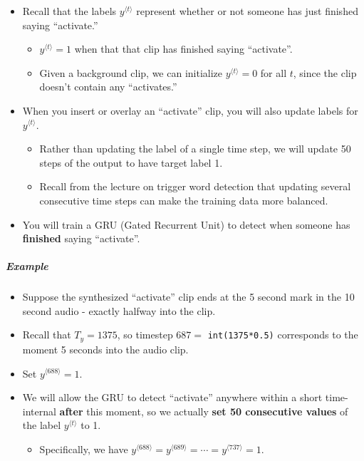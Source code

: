 \documentclass[11pt]{article}
\begin{document}
\begin{itemize}
\itemsep1pt\parskip0pt
\item
  Recall that the labels $y^{\langle t \rangle}$ represent whether or
  not someone has just finished saying ``activate.''

  \begin{itemize}
  \itemsep1pt\parskip0pt
  \item
    $y^{\langle t \rangle} = 1$ when that that clip has finished saying
    ``activate''.
  \item
    Given a background clip, we can initialize $y^{\langle t \rangle}=0$
    for all $t$, since the clip doesn't contain any ``activates.''
  \end{itemize}
\item
  When you insert or overlay an ``activate'' clip, you will also update
  labels for $y^{\langle t \rangle}$.

  \begin{itemize}
  \itemsep1pt\parskip0pt
  \item
    Rather than updating the label of a single time step, we will update
    50 steps of the output to have target label 1.
  \item
    Recall from the lecture on trigger word detection that updating
    several consecutive time steps can make the training data more
    balanced.
  \end{itemize}
\item
  You will train a GRU (Gated Recurrent Unit) to detect when someone has
  \textbf{finished} saying ``activate''.
\end{itemize}

\subparagraph{Example}\label{example}

\begin{itemize}
\itemsep1pt\parskip0pt
\item
  Suppose the synthesized ``activate'' clip ends at the 5 second mark in
  the 10 second audio - exactly halfway into the clip.
\item
  Recall that $T_y = 1375$, so timestep $687 = $ \texttt{int(1375*0.5)}
  corresponds to the moment 5 seconds into the audio clip.
\item
  Set $y^{\langle 688 \rangle} = 1$.
\item
  We will allow the GRU to detect ``activate'' anywhere within a short
  time-internal \textbf{after} this moment, so we actually \textbf{set
  50 consecutive values} of the label $y^{\langle t \rangle}$ to 1.

  \begin{itemize}
  \itemsep1pt\parskip0pt
  \item
    Specifically, we have
    $y^{\langle 688 \rangle} = y^{\langle 689 \rangle} = \cdots = y^{\langle 737 \rangle} = 1$.
  \end{itemize}
\end{itemize}
\end{document}
